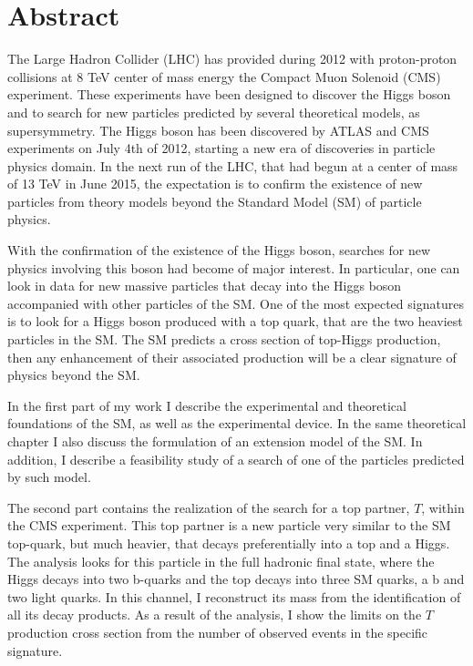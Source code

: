 \begingroup
\let\clearpage\relax
\let\cleardoublepage\relax
\let\cleardoublepage\relax

\chapter*{Abstract}

The Large Hadron Collider (LHC) has provided during 2012 with proton-proton collisions at 8 TeV center of mass energy the Compact Muon Solenoid (CMS) experiment. These experiments have been designed to discover the Higgs boson and to search for new particles predicted by several theoretical models, as supersymmetry. The Higgs boson has been discovered by ATLAS and CMS experiments on July 4th of 2012, starting a new era of discoveries in particle physics domain. In the next run of the LHC, that had begun at a center of mass of 13 TeV in June 2015, the expectation is to confirm the existence of new particles from theory models beyond the Standard Model (SM) of particle physics.

With the confirmation of the existence of the Higgs boson, searches for new physics involving this boson had become of major interest. In particular, one can look in data for new massive particles that decay into the Higgs boson accompanied with other particles of the SM. One of the most expected signatures is to look for a Higgs boson produced with a top quark, that are the two heaviest particles in the SM. The SM predicts a cross section of top-Higgs production, then any enhancement of their associated production will be a clear signature of physics beyond the SM.

In the first part of my work I describe the experimental and theoretical foundations of the SM, as well as the experimental device. In the same theoretical chapter I also discuss the formulation of an extension model of the SM. In addition, I describe a feasibility study of a search of one of the particles predicted by such model.

The second part contains the realization of the search for a top partner, $T$, within the CMS experiment. This top partner is a new particle very similar to the SM top-quark, but much heavier, that decays preferentially into a top and a Higgs. The analysis looks for this particle in the full hadronic final state, where the Higgs decays into two b-quarks and the top decays into three SM quarks, a b and two light quarks. In this channel, I reconstruct its mass from the identification of all its decay products. As a result of the analysis, I show the limits on the $T$ production cross section from the number of observed events in the specific signature.

